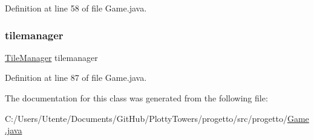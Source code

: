 Definition at line 58 of file Game.\+java.

\mbox{\label{classprogetto_1_1_game_a6d3aeeb21b7d0a3598a949b8c244f7bf}} 
\subsubsection{\texorpdfstring{tilemanager}{tilemanager}}
{\footnotesize\ttfamily \hyperlink{classmanagers_1_1_tile_manager}{Tile\+Manager} tilemanager\hspace{0.3cm}{\ttfamily [private]}}



Definition at line 87 of file Game.\+java.



The documentation for this class was generated from the following file\+:\begin{DoxyCompactItemize}
\item 
C\+:/\+Users/\+Utente/\+Documents/\+Git\+Hub/\+Plotty\+Towers/progetto/src/progetto/\hyperlink{_game_8java}{Game.\+java}\end{DoxyCompactItemize}
